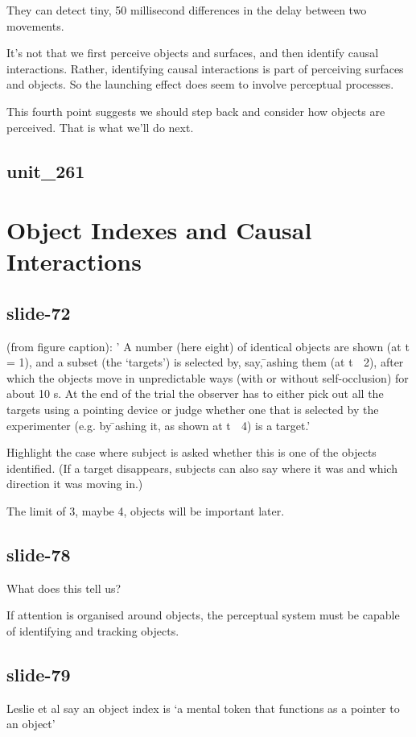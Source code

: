\documentclass[12pt,\papersize]{extarticle}
\begin{document}
They can detect tiny, 50 millisecond differences in the delay between two movements.
 
It's not that we first perceive objects and surfaces, and then identify causal interactions.
Rather, identifying causal interactions is part of perceiving surfaces and objects.  
So the launching effect does seem to involve perceptual processes.
 
This fourth point suggests we should step back and consider how objects are perceived.
That is what we'll do next.
 
\subsection{unit\_261}
 
 
\section{Object Indexes and Causal Interactions}
 
\subsection{slide-72}
(from figure caption): ' A number (here eight) of identical objects are shown (at t = 1), 
and a subset (the `targets') is selected by, say,  ̄ashing them (at t 􏰈 2), after which 
the objects move in unpredictable ways (with or without self-occlusion) for about 10 s. 
At the end of the trial the observer has to either pick out all the targets using a 
pointing device or judge whether one that is selected by the experimenter (e.g. by 
 ̄ashing it, as shown at t 􏰈 4) is a target.' \citep[p.\ 142]{Pylyshyn:2001hl}
 
Highlight the case where subject is asked whether this is one of the objects identified.
(If a target disappears, subjects can also say where it was and which direction it was 
moving in.)
 
The limit of 3, maybe 4, objects will be important later.
 
\subsection{slide-78}
What does this tell us?
 
If attention is organised around objects, the perceptual system must be capable of identifying and tracking objects.
 
\subsection{slide-79}
Leslie et al say an object index is ‘a mental token that functions as a pointer to an 
object’ \citep[p.\ 11]{Leslie:1998zk}
 
\end{document}
